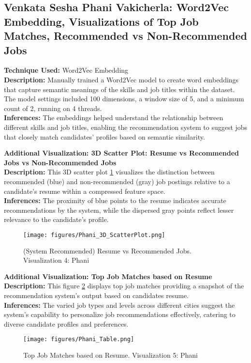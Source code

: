 \documentclass[a4paper,10pt]{article}
\begin{document}
\subsection{Venkata Sesha Phani Vakicherla: Word2Vec Embedding, Visualizations of Top Job Matches, Recommended vs Non-Recommended Jobs}
\textbf{Technique Used:} Word2Vec Embedding\\
\textbf{Description:} Manually trained a Word2Vec model to create word embeddings that capture semantic meanings of the skills and job titles within the dataset. The model settings included 100 dimensions, a window size of 5, and a minimum count of 2, running on 4 threads.\\
\textbf{Inferences:} The embeddings helped understand the relationship between different skills and job titles, enabling the recommendation system to suggest jobs that closely match candidates' profiles based on semantic similarity.

\textbf{Additional Visualization: 3D Scatter Plot: Resume vs Recommended Jobs vs Non-Recommended Jobs}\\
\textbf{Description:} This 3D scatter plot \ref{fig_scat_plot} visualizes the distinction between recommended (blue) and non-recommended (gray) job postings relative to a candidate’s resume within a compressed feature space. \\
\textbf{Inferences:} The proximity of blue points to the resume indicates accurate recommendations by the system, while the dispersed gray points reflect lesser relevance to the candidate's profile.

    \begin{figure}[ht]
    \centering
    \texttt{[image: figures/Phani\_3D\_ScatterPlot.png]}
    \caption{(System Recommended) Resume vs Recommended Jobs. Visualization 4: Phani}
    \label{fig_scat_plot}
    \end{figure}

\textbf{Additional Visualization: Top Job Matches based on Resume}\\
\textbf{Description:} This figure \ref{fig_table} displays top job matches providing a snapshot of the recommendation system’s output based on candidates resume.\\
\textbf{Inferences:} The varied job types and levels across different cities suggest the system's capability to personalize job recommendations effectively, catering to diverse candidate profiles and preferences.

 \begin{figure}[ht]
    \centering
    \texttt{[image: figures/Phani\_Table.png]}
    \caption{Top Job Matches based on Resume. Visualization 5: Phani}
    \label{fig_table}
    \end{figure}
\end{document}
